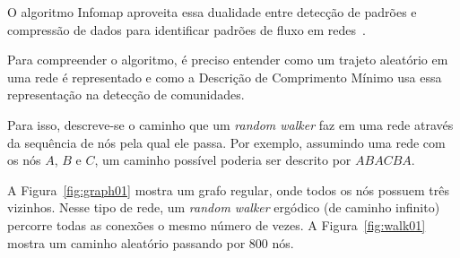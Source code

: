 \documentclass[
  article,
  11pt,
  a4paper,
  english,
  brazil,
  sumario=tradicional]{abntex2}
\begin{document}
O algoritmo Infomap aproveita essa dualidade entre detecção de padrões e compressão de dados para identificar padrões de fluxo em redes~\cite{Rosvall2009-sd}.

Para compreender o algoritmo, é preciso entender como um trajeto aleatório em uma rede é representado e como a Descrição de Comprimento Mínimo usa essa representação na detecção de comunidades.

Para isso, descreve-se o caminho que um \textit{random walker} faz em uma rede através da sequência de nós pela qual ele passa. Por exemplo, assumindo uma rede com os nós $A$, $B$ e $C$, um caminho possível poderia ser descrito por $ABACBA$.

A Figura~\ref{fig:graph01} mostra um grafo regular, onde todos os nós possuem três vizinhos. Nesse tipo de rede, um \textit{random walker} ergódico (de caminho infinito) percorre todas as conexões o mesmo número de vezes. A Figura~\ref{fig:walk01} mostra um caminho aleatório passando por 800 nós.
\end{document}
